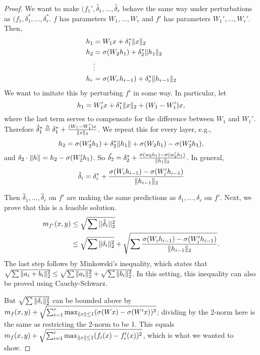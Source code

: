 \begin{proof}
We want to make $(f_1', \hat{\delta}_1, ..., \hat{\delta}_r$ behave the same way under perturbations as $(f_1, \delta_1^*, ..., \delta_r^*$. $f$ has parameters $W_1, ..., W_r$ and $f'$ has parameters $W_1', ..., W_r'$. Then,
\begin{align}
    h_1 &= W_1 x + \delta_1^* \|x\|_2 \\
    h_2 &= \sigma(W_2 h_1) + \delta_2^* \|h_1\|_2 \\
    &\vdots \\
    h_r &= \sigma(W_r h_{r - 1}) + \delta_r^* \|h_{r - 1}\|_2
\end{align}
We want to imitate this by perturbing $f'$ in some way. In particular, let
\begin{equation}
    h_1 = W_1'x + \delta_1^* \|x\|_2 + (W_1 - W_1')x,
\end{equation}
where the last term serves to compensate for the difference between $W_1$ and $W_1'$. Therefore $\hat{\delta}_1^* \defeq \delta_1^* + \frac{(W_1 - W_1')x}{\norm{x}_2}$.
We repeat this for every layer, e.g.,
\begin{equation}
    h_2 = \sigma(W_2' h_1) + \delta_2^*\|h_1\| + \sigma(W_2 h_1) - \sigma(W_2' h_1),
\end{equation}
and $\delta_2 \cdot \|h\| = h_2 - \sigma(W_2' h_1)$. So $\hat{\delta_2} = \delta_2^* + \frac{\sigma(w_2 h_1) - \sigma(w_2' h_1)}{\|h_1\|_2}$. In general, 
\begin{align}
    \hat{\delta}_i = \delta_i^* + \frac{\sigma(W_ih_{i-1}) - \sigma(W_i' h_{i-1})}{\|h_{i-1}\|_2}
\end{align} 

Then $\hat{\delta}_1, ..., \hat{\delta}_r$ on $f'$ are making the same predictions as $\delta_1, ..., \delta_r$ on $f'$. Next, we prove that this is a feasible solution.
\begin{align}
    m_{f'}(x, y) &\leq \sqrt{\sum ||\hat{\delta}_i||_2^2} \\
    &\leq \sqrt{\sum \|\delta_i\|_2^2} + \sqrt{\sum \frac{\sigma(W_i h_{i-1}) - \sigma(W_i' h_{i-1})}{\|h_{i-1}\|_2}}. 
\end{align} 
The last step follows by Minkowski's inequality, which states that $\sqrt{\sum \|a_i + b_i\|_2^2} \leq \sqrt{\sum \|a_i\|_2^2} + \sqrt{\sum \|b_i\|_2^2}$. In this setting, this inequality can also be proved using Cauchy-Schwarz.

But $\sqrt{\sum \|\delta_i\|_2^2}$ can be bounded above by $m_f(x, y) + \sqrt{\sum_{i=1}^r \max_{\|x\| \leq 1} (\sigma(Wx)-\sigma(W'x))^2}$; dividing by the 2-norm here is the same as restricting the 2-norm to be 1. This equals $m_f(x, y) + \sqrt{\sum_{i=1}^r \max_{\|x\| \leq 1} (f_i(x)-f_i'(x))^2}$, which is what we wanted to show.
\end{proof}
